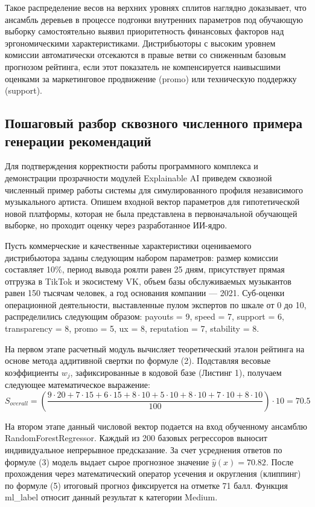 \documentclass[14pt, a4paper]{extarticle}
\begin{document}
Такое распределение весов на верхних уровнях сплитов наглядно доказывает, что ансамбль деревьев в процессе подгонки внутренних параметров под обучающую выборку самостоятельно выявил приоритетность финансовых факторов над эргономическими характеристиками. Дистрибьюторы с высоким уровнем комиссии автоматически отсекаются в правые ветви со сниженным базовым прогнозом рейтинга, если этот показатель не компенсируется наивысшими оценками за маркетинговое продвижение (promo) или техническую поддержку (support).

\subsection{Пошаговый разбор сквозного численного примера генерации рекомендаций}

Для подтверждения корректности работы программного комплекса и демонстрации прозрачности модулей Explainable AI приведем сквозной численный пример работы системы для симулированного профиля независимого музыкального артиста. Опишем входной вектор параметров для гипотетической новой платформы, которая не была представлена в первоначальной обучающей выборке, но проходит оценку через разработанное ИИ-ядро.

Пусть коммерческие и качественные характеристики оцениваемого дистрибьютора заданы следующим набором параметров: размер комиссии составляет 10\%, период вывода роялти равен 25 дням, присутствует прямая отгрузка в TikTok и экосистему VK, объем базы обслуживаемых музыкантов равен 150 тысячам человек, а год основания компании --- 2021. Суб-оценки операционной деятельности, выставленные пулом экспертов по шкале от 0 до 10, распределились следующим образом: payouts = 9, speed = 7, support = 6, transparency = 8, promo = 5, ux = 8, reputation = 7, stability = 8.

На первом этапе расчетный модуль вычисляет теоретический эталон рейтинга на основе метода аддитивной свертки по формуле (2). Подставляя весовые коэффициенты $w_j$, зафиксированные в кодовой базе (Листинг 1), получаем следующее математическое выражение:
\begin{equation}
S_{overall} = \left( \frac{9 \cdot 20 + 7 \cdot 15 + 6 \cdot 15 + 8 \cdot 10 + 5 \cdot 10 + 8 \cdot 10 + 7 \cdot 10 + 8 \cdot 10}{100} \right) \cdot 10 = 70.5
\end{equation}

На втором этапе данный числовой вектор подается на вход обученному ансамблю RandomForestRegressor. Каждый из 200 базовых регрессоров выносит индивидуальное непрерывное предсказание. За счет усреднения ответов по формуле (3) модель выдает сырое прогнозное значение $\hat{y}(x) = 70.82$. После прохождения через математический оператор усечения и округления (клиппинг) по формуле (5) итоговый прогноз фиксируется на отметке 71 балл. Функция ml\_label относит данный результат к категории Medium.
\end{document}
